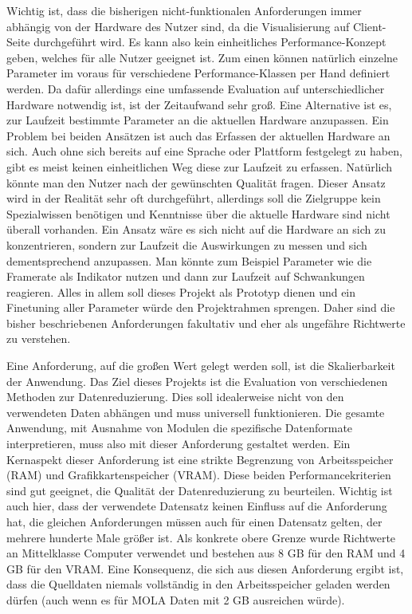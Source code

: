 Wichtig ist, dass die bisherigen nicht-funktionalen Anforderungen immer abhängig von der Hardware des Nutzer sind, da die Visualisierung auf Client-Seite durchgeführt wird. Es kann also kein einheitliches Performance-Konzept geben, welches für alle Nutzer geeignet ist. Zum einen können natürlich einzelne Parameter im voraus für verschiedene Performance-Klassen per Hand definiert werden. Da dafür allerdings eine umfassende Evaluation auf unterschiedlicher Hardware notwendig ist, ist der Zeitaufwand sehr groß. Eine Alternative ist es, zur Laufzeit bestimmte Parameter an die aktuellen Hardware anzupassen. Ein Problem bei beiden Ansätzen ist auch das Erfassen der aktuellen Hardware an sich. Auch ohne sich bereits auf eine Sprache oder Plattform festgelegt zu haben, gibt es meist keinen einheitlichen Weg diese zur Laufzeit zu erfassen. Natürlich könnte man den Nutzer nach der gewünschten Qualität fragen. Dieser Ansatz wird in der Realität sehr oft durchgeführt, allerdings soll die Zielgruppe kein Spezialwissen benötigen und Kenntnisse über die aktuelle Hardware sind nicht überall vorhanden. Ein Ansatz wäre es sich nicht auf die Hardware an sich zu konzentrieren, sondern zur Laufzeit die Auswirkungen zu messen und sich dementsprechend anzupassen. Man könnte zum Beispiel Parameter wie die Framerate als Indikator nutzen und dann zur Laufzeit auf Schwankungen reagieren. Alles in allem soll dieses Projekt als Prototyp dienen und ein Finetuning aller Parameter würde den Projektrahmen sprengen. Daher sind die bisher beschriebenen Anforderungen fakultativ und eher als ungefähre Richtwerte zu verstehen.

Eine Anforderung, auf die großen Wert gelegt werden soll, ist die Skalierbarkeit der Anwendung. Das Ziel dieses Projekts ist die Evaluation von verschiedenen Methoden zur Datenreduzierung. Dies soll idealerweise nicht von den verwendeten Daten abhängen und muss universell funktionieren. Die gesamte Anwendung, mit Ausnahme von Modulen die spezifische Datenformate interpretieren, muss also mit dieser Anforderung gestaltet werden. Ein Kernaspekt dieser Anforderung ist eine strikte Begrenzung von Arbeitsspeicher (RAM) und Grafikkartenspeicher (VRAM). Diese beiden Performancekriterien sind gut geeignet, die Qualität der Datenreduzierung zu beurteilen. Wichtig ist auch hier, dass der verwendete Datensatz keinen Einfluss auf die Anforderung hat, die gleichen Anforderungen müssen auch für einen Datensatz gelten, der mehrere hunderte Male größer ist. Als konkrete obere Grenze wurde Richtwerte an Mittelklasse Computer verwendet und bestehen aus 8 GB für den RAM und 4 GB für den VRAM. Eine Konsequenz, die sich aus diesen Anforderung ergibt ist, dass die Quelldaten niemals vollständig in den Arbeitsspeicher geladen werden dürfen (auch wenn es für MOLA Daten mit 2 GB ausreichen würde).
